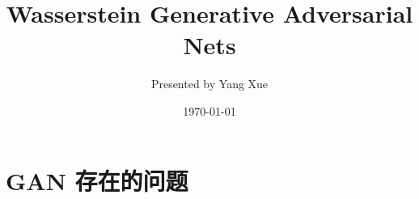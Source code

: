 \documentclass[xelatex]{beamer}
\title[]{Wasserstein Generative Adversarial Nets}
\author{Presented by Yang Xue}
\institute[SCU] 
{
Sichuan University \\ 
\medskip
}
\date{\today}
\begin{document}
\begin{frame}
\titlepage 
\end{frame}



\section{GAN 存在的问题}
\end{document}
